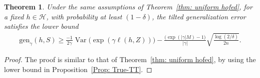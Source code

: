 \documentclass{article}
\theoremstyle{plain}
\theoremstyle{plain}
\newtheorem{theorem}{Theorem}[section]
\theoremstyle{definition}
\theoremstyle{remark}
\newtheorem{remark}[theorem]{Remark}
\begin{document}

\begin{tcolorbox}
    \begin{theorem}\label{thm: uniform hofed lower}
  Under the same assumptions of Theorem~\ref{thm: uniform hofed}, for a fixed $h\in\mathcal{H}$, with probability at least $(1-\delta)$, the tilted generalization error satisfies the lower bound 
    \begin{equation}
        \begin{split}
          \mathrm{gen}_{\gamma}(h,S)\geq \frac{-1}{2\gamma}\operatorname{Var}\big(\exp(\gamma \ell (h,Z))\big) - \frac{\big(\exp(|\gamma|M)-1\big)}{|\gamma|}\sqrt{\frac{\log(2/\delta)} {2n}}.
        \end{split}
    \end{equation}
\end{theorem}
\end{tcolorbox}

\begin{proof}
    The proof is similar to that of  Theorem~\ref{thm: uniform hofed}, by using the lower bound in Proposition~\ref{Prop: True-TT}.
\end{proof}
\end{document}
